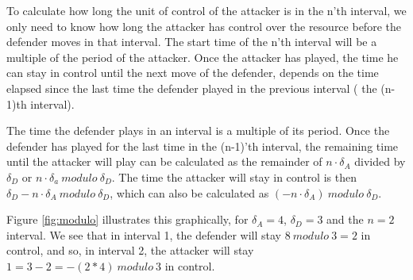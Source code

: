 To calculate how long the unit of control of the attacker is in the n'th interval, we only need to know how long the attacker has control over the resource before the defender moves in that interval. The start time of the n'th interval will be a multiple of the period of the attacker. Once the attacker has played, the time he can stay in control until the next move of the defender, depends on the time elapsed since the last time the defender played in the previous interval ( the (n-1)th interval).  

The time the defender plays in an interval is a multiple of its period. Once the defender has played for the last time in the (n-1)'th interval, the remaining time until the attacker will play can be calculated as the remainder of $n\cdot \delta_{A}$ divided by $\delta_{D}$ or $n \cdot \delta_{a}~modulo~ \delta_{D}$. The time the attacker will stay in control is then $\delta_{D}- n \cdot \delta_{A}~ modulo ~ \delta_{D}$, which can also be calculated as $( -n \cdot \delta_{A}) ~modulo~ \delta_{D}$.  

Figure \ref{fig:modulo} illustrates this graphically, for $\delta_{A}= 4$, $\delta_{D}=3$ and the $n=2$ interval. We see that in interval 1, the defender will stay $8 ~modulo~ 3 = 2$ in control, and so, in interval 2, the attacker will stay $1 = 3 - 2 = -(2*4) ~modulo~ 3$ in control.


